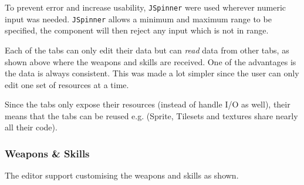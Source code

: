 To prevent error and increase usability,  \texttt{JSpinner} were used wherever numeric input was needed. \texttt{JSpinner} allows a minimum and maximum range to be specified,  the component will then reject any input which is not in range.

Each of the tabs can only edit their data but can \emph{read} data from other tabs, as shown above where the weapons and skills are received. One of the advantages is the data is always consistent. This was made a lot simpler since the user can only edit one set of resources at a time.

Since the tabs only expose their resources (instead of handle I/O as well),  their means that the tabs can be reused e.g. (Sprite, Tilesets and textures share nearly all their code).

\clearpage
\subsubsection{Weapons \& Skills}

The editor support customising the weapons and skills as shown. 

